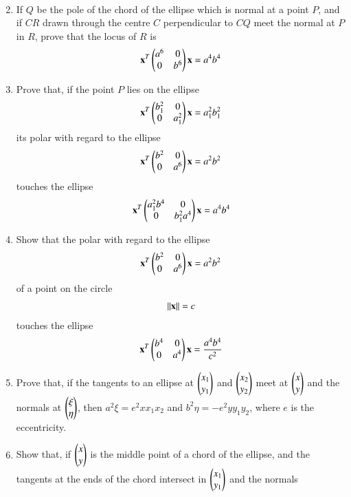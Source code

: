 \begin{enumerate}[label=\arabic*.,ref=\thesubsection.\theenumi]
\begin{align}
\end{align}
\item  If $Q$ be the pole of the chord of the ellipse which is normal at a point $P$, and if
$CR$ drawn through the centre $C$ perpendicular to $CQ$ meet the normal at $P$ in $R$, prove that the locus of $R$ is
\begin{align}
\mathbf{x}^T\begin{pmatrix}a^6 & 0\\0 & b^6\end{pmatrix}\mathbf{x} =a^4b^4
\end{align}
\item Prove that, if the point $P$ lies on the ellipse 
\begin{align}
\mathbf{x}^T\begin{pmatrix}b_1^2 & 0\\0 & a_1^2\end{pmatrix}\mathbf{x} =a_1^2b_1^2
\end{align}
 its polar with regard to the 
ellipse 
\begin{align}
\mathbf{x}^T\begin{pmatrix}b^2 & 0\\0 & a^6\end{pmatrix}\mathbf{x} =a^2b^2
\end{align}
touches
the ellipse
\begin{align}
\mathbf{x}^T\begin{pmatrix}a_1^2b^4 & 0\\0 & b_1^2a^4\end{pmatrix}\mathbf{x} =a^4b^4
\end{align}
\item Show that the polar with regard to the ellipse 
\begin{align}
\mathbf{x}^T\begin{pmatrix}b^2 & 0\\0 & a^6\end{pmatrix}\mathbf{x} =a^2b^2
\end{align}
of a point on the circle 
\begin{align}
\left\lVert\mathbf{x}\right\rVert = c
\end{align}
 touches the ellipse 
\begin{align}
\mathbf{x}^T\begin{pmatrix}b^4 & 0\\0 & a^4\end{pmatrix}\mathbf{x} =\frac{a^4b^4}{c^2}
\end{align}
\item Prove that, if the tangents to an ellipse at $\begin{pmatrix}x_1\\y_1\end{pmatrix}$ and $\begin{pmatrix}x_2\\y_2\end{pmatrix}$ meet at $\begin{pmatrix}x\\y\end{pmatrix}$ and the normals at
$\begin{pmatrix}\xi\\\eta\end{pmatrix}$, then $a^2\xi=e^2xx_1x_2$ and $b^2\eta = -e^2yy_1y_2$, where $e$ is the eccentricity.
\item Show that, if $\begin{pmatrix}x\\y\end{pmatrix}$ is the middle point of a chord of the ellipse,
and the tangents at the ends of the chord intersect in $\begin{pmatrix}x_1\\y_1\end{pmatrix}$ and the normals

\end{enumerate}
